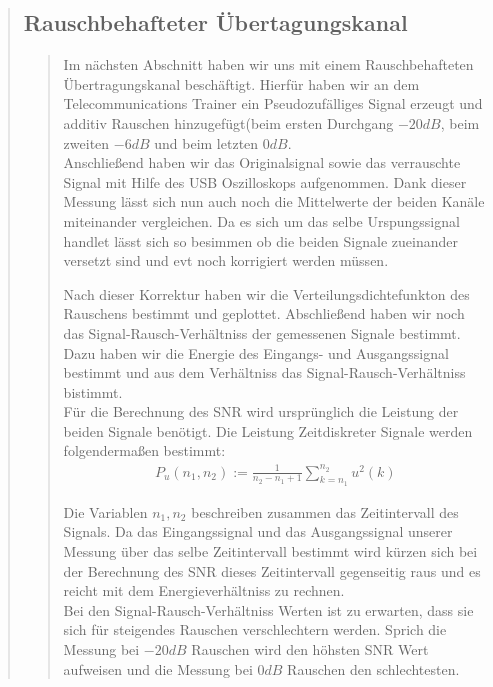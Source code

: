 \begin{quote}
  
    
    \subsection{Rauschbehafteter Übertagungskanal}
    \begin{quote}
        Im nächsten Abschnitt haben wir uns mit einem Rauschbehafteten Übertragungskanal beschäftigt. Hierfür haben wir
        an dem Telecommunications Trainer ein Pseudozufälliges Signal erzeugt und additiv Rauschen hinzugefügt(beim
        ersten Durchgang $-20dB$, beim zweiten $-6dB$ und beim letzten $0dB$.\\
        Anschließend haben wir das Originalsignal sowie das verrauschte Signal mit Hilfe des USB Oszilloskops
        aufgenommen. Dank dieser Messung lässt sich nun auch noch die Mittelwerte der beiden Kanäle miteinander
        vergleichen. Da es sich um das selbe Urspungssignal handlet lässt sich so besimmen ob die beiden Signale
        zueinander versetzt sind und evt noch korrigiert werden müssen.\vspace{1em}
        
        Nach dieser Korrektur haben wir die Verteilungsdichtefunkton des Rauschens bestimmt und geplottet. Abschließend
        haben wir noch das Signal-Rausch-Verhältniss der gemessenen Signale bestimmt. Dazu haben wir die Energie des
        Eingangs- und Ausgangssignal bestimmt und aus dem Verhältniss das Signal-Rausch-Verhältniss bistimmt.\\
        Für die Berechnung des SNR wird ursprünglich die Leistung der beiden Signale benötigt. Die Leistung
        Zeitdiskreter Signale werden folgendermaßen bestimmt:
        \begin{equation*}
        	\begin{split}
        		P_u(n_1, n_2) := \frac{1}{n_2 - n_1 + 1} \sum_{k=n_1}^{n_2} u^2 (k)
        	\end{split}
        \end{equation*}
        
        Die Variablen $n_1,n_2$ beschreiben zusammen das Zeitintervall des Signals. Da das Eingangssignal und das
        Ausgangssignal unserer Messung über das selbe Zeitintervall bestimmt wird kürzen sich bei der Berechnung des SNR
        dieses Zeitintervall gegenseitig raus und es reicht mit dem Energieverhältniss zu rechnen.\\
        Bei den Signal-Rausch-Verhältniss Werten ist zu erwarten, dass sie sich für steigendes Rauschen verschlechtern
        werden. Sprich die Messung bei $-20dB$ Rauschen wird den höhsten SNR Wert aufweisen und die Messung bei $0dB$
        Rauschen den schlechtesten.


\end{quote}
\end{quote}
